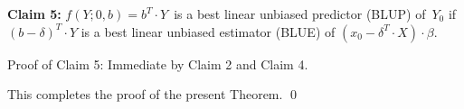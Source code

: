 \vskip 0.5cm
\noindent
\textbf{Claim 5:}\quad
$f(Y;0,b) = b^{T}\cdot Y$\, is a best linear unbiased predictor (BLUP) of \,$Y_{0}$ if
$(b-\delta)^{T} \cdot Y$ is a best linear unbiased estimator (BLUE) of
$(x_{0} - \delta^{T}\cdot X) \cdot \beta$.

\vskip 0.2cm
\noindent
Proof of Claim 5: \quad Immediate by Claim 2 and Claim 4.

\vskip 0.5cm
\noindent
This completes the proof of the present Theorem.
\qed


\renewcommand{\theenumi}{\roman{enumi}}
\renewcommand{\labelenumi}{\textnormal{(\theenumi)}$\;\;$}

